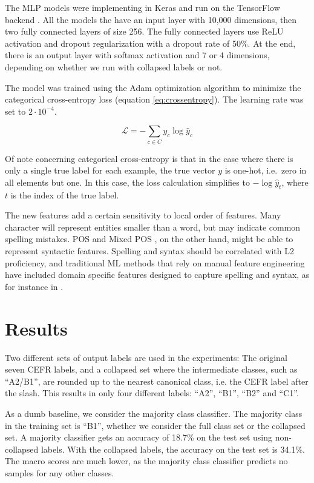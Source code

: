The MLP models were implementing in Keras \autocite{keras} and run on the
TensorFlow backend \autocite{tensorflow}. All the models the have an input
layer with 10,000 dimensions, then two fully connected layers of size 256.
The fully connected layers use \ac{ReLU} activation and dropout
regularization with a dropout rate of 50\%. At the end, there is an output
layer with softmax activation and 7 or 4 dimensions, depending on whether we
run with collapsed labels or not.

The model was trained using the Adam optimization algorithm
\autocite{kingma2014adam} to minimize the categorical cross-entropy loss
(equation \ref{eq:crossentropy}). The learning rate was set to $2\cdot
10^{-4}$.

\begin{equation}\label{eq:crossentropy}
  \mathcal{L} = -\sum_{c\in C} {y_c \log{{\hat y}_c}}
\end{equation}

Of note concerning categorical cross-entropy is that in the case where there
is only a single true label for each example, the true vector $y$ is one-hot,
i.e.\ zero in all elements but one. In this case, the loss calculation
simplifies to $-\log{{\hat y}_t}$, where $t$ is the index of the true label.

The new \ngram features add a certain sensitivity to local order of features.
Many character \ngrams will represent entities smaller than a word, but may
indicate common spelling mistakes. \ac{POS} and Mixed POS \ngrams, on the
other hand, might be able to represent syntactic features. Spelling and
syntax should be correlated with L2 proficiency, and traditional \ac{ML}
methods that rely on manual feature engineering have included domain specific
features designed to capture spelling and syntax, as for instance in
\textcite{vajjala17}.


\section{Results}

Two different sets of output labels are used in the experiments: The original
seven CEFR labels, and a collapsed set where the intermediate classes, such
as ``A2/B1'', are rounded up to the nearest canonical class, i.e. the CEFR
label after the slash. This results in only four different labels: ``A2'',
``B1'', ``B2'' and ``C1''.

As a dumb baseline, we consider the majority class classifier. The majority
class in the training set is ``B1'', whether we consider the full class set
or the collapsed set. A majority classifier gets an accuracy of 18.7\% on the
test set using non-collapsed labels. With the collapsed labels, the accuracy
on the test set is 34.1\%. The macro \FI scores are much lower, as the
majority class classifier predicts no samples for any other classes.

